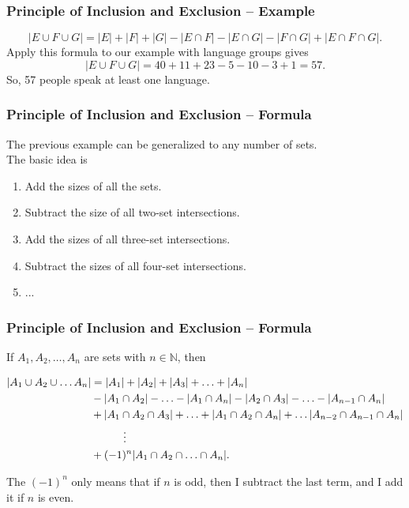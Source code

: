 \documentclass[aspectratio=169,11pt,usenames,dvipsnames]{beamer}
\begin{document}
\begin{frame}
 \frametitle{Principle of Inclusion and Exclusion -- Example}
 \[
  |E \cup F \cup G| = |E| + |F| + |G| - |E \cap F| - |E \cap G| - |F \cap G| +
  |E \cap F \cap G|.
 \]
 Apply this formula to our example with language groups gives
 \[
  |E \cup F \cup G| = 40 + 11 + 23 - 5 - 10 - 3 + 1 = 57.
 \]
 \pause
 So, 57 people speak at least one language.
\end{frame}

\begin{frame}
 \frametitle{Principle of Inclusion and Exclusion -- Formula}
 The previous example can be generalized to any number of sets.\pause\\
 The basic idea is
 \begin{enumerate}
  \item Add the sizes of all the sets.\pause
  \item Subtract the size of all two-set intersections.\pause
  \item Add the sizes of all three-set intersections.\pause
  \item Subtract the sizes of all four-set intersections.\pause
  \item ...
 \end{enumerate}
\end{frame}

\begin{frame}
 \frametitle{Principle of Inclusion and Exclusion -- Formula}
 If $A_1,A_2,\ldots,A_n$ are sets with $n \in \mathbb{N}$, then
 \begin{tcolorbox}[top=-\parskip,title=Principle of Inclusion and Exclusion]
  \begin{align*}
   |A_1 \cup A_2 \cup \ldots A_n| &= |A_1| + |A_2| + |A_3| + \ldots + |A_n|\\
                                  &- |A_1 \cap A_2| - \ldots - |A_1 \cap A_n| -
                                  |A_2 \cap A_3| - \ldots - |A_{n-1} \cap A_n|\\
                                  &+ |A_1 \cap A_2 \cap A_3| + \ldots + |A_1
                                  \cap A_2 \cap A_n| + \ldots |A_{n-2} \cap
                                  A_{n-1} \cap A_n|\\
                                  & \hspace*{3em} \vdots \\
                                  & + (-1)^{n} |A_1 \cap A_2 \cap \ldots \cap
                                  A_n|.
  \end{align*}
 \end{tcolorbox}
 \pause
 The $(-1)^{n}$ only means that if $n$ is odd, then I subtract the last term,
 and I add it if $n$ is even.
\end{frame}
\end{document}
